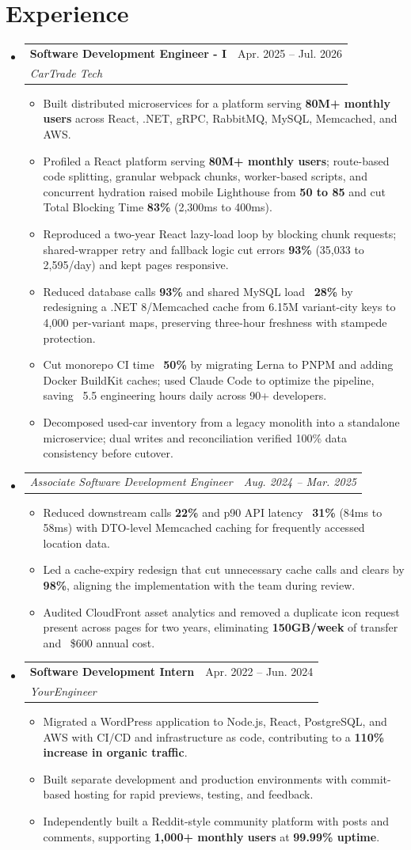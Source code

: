 \documentclass[letterpaper,11pt]{article}
\makeatletter
\newcommand{\resumeItem}[1]{\item\small{{#1 \vspace{-2pt}}}}
\newcommand{\resumeSubheading}[4]{\vspace{-2pt}\item\begin{tabular*}{0.97\textwidth}[t]{l@{\extracolsep{\fill}}r}\textbf{#1} & #2 \\\textit{\small#3} & \textit{\small #4} \\\end{tabular*}\vspace{-7pt}}
\newcommand{\resumeSubSubheading}[2]{\item\begin{tabular*}{0.97\textwidth}{l@{\extracolsep{\fill}}r}\textit{\small#1} & \textit{\small #2} \\\end{tabular*}\vspace{-7pt}}
\newcommand{\resumeSubHeadingListStart}{\begin{itemize}[leftmargin=0.15in, label={}]}
\newcommand{\resumeSubHeadingListEnd}{\end{itemize}}
\newcommand{\resumeItemListStart}{\begin{itemize}}
\newcommand{\resumeItemListEnd}{\end{itemize}\vspace{-5pt}}
\makeatother
\begin{document}
\section{Experience}
\resumeSubHeadingListStart
\resumeSubheading
{Software Development Engineer - I}{Apr. 2025 -- Jul. 2026}
{CarTrade Tech}{ }
\resumeItemListStart
\resumeItem{Built distributed microservices for a platform serving \textbf{80M+ monthly users} across React, .NET, gRPC, RabbitMQ, MySQL, Memcached, and AWS.}
\resumeItem{Profiled a React platform serving \textbf{80M+ monthly users}; route-based code splitting, granular webpack chunks, worker-based scripts, and concurrent hydration raised mobile Lighthouse from \textbf{50 to 85} and cut Total Blocking Time \textbf{83\%} (2,300ms to 400ms).}
\resumeItem{Reproduced a two-year React lazy-load loop by blocking chunk requests; shared-wrapper retry and fallback logic cut errors \textbf{93\%} (35,033 to 2,595/day) and kept pages responsive.}
\resumeItem{Reduced database calls \textbf{93\%} and shared MySQL load ~\textbf{28\%} by redesigning a .NET 8/Memcached cache from 6.15M variant-city keys to 4,000 per-variant maps, preserving three-hour freshness with stampede protection.}
\resumeItem{Cut monorepo CI time ~\textbf{50\%} by migrating Lerna to PNPM and adding Docker BuildKit caches; used Claude Code to optimize the pipeline, saving ~5.5 engineering hours daily across 90+ developers.}
\resumeItem{Decomposed used-car inventory from a legacy monolith into a standalone microservice; dual writes and reconciliation verified 100\% data consistency before cutover.}
\resumeItemListEnd
\resumeSubSubheading
{Associate Software Development Engineer}{Aug. 2024 -- Mar. 2025}
\resumeItemListStart
\resumeItem{Reduced downstream calls \textbf{22\%} and p90 API latency ~\textbf{31\%} (84ms to 58ms) with DTO-level Memcached caching for frequently accessed location data.}
\resumeItem{Led a cache-expiry redesign that cut unnecessary cache calls and clears by \textbf{98\%}, aligning the implementation with the team during review.}
\resumeItem{Audited CloudFront asset analytics and removed a duplicate icon request present across pages for two years, eliminating \textbf{150GB/week} of transfer and ~\$600 annual cost.}
\resumeItemListEnd
\resumeSubheading
{Software Development Intern}{Apr. 2022 -- Jun. 2024}
{YourEngineer}{ }
\resumeItemListStart
\resumeItem{Migrated a WordPress application to Node.js, React, PostgreSQL, and AWS with CI/CD and infrastructure as code, contributing to a \textbf{110\% increase in organic traffic}.}
\resumeItem{Built separate development and production environments with commit-based hosting for rapid previews, testing, and feedback.}
\resumeItem{Independently built a Reddit-style community platform with posts and comments, supporting \textbf{1,000+ monthly users} at \textbf{99.99\% uptime}.}
\resumeItemListEnd
\resumeSubHeadingListEnd
\end{document}
